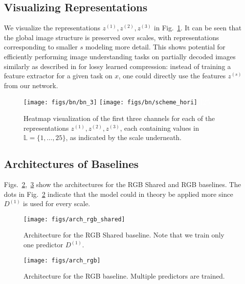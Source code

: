 \documentclass[10pt,twocolumn,letterpaper]{article}
\newcommand{\levels}{\mathbb{L}}
\begin{document}
\clearpage


\subsection{Visualizing Representations} \label{sec:visualize_repr}

We visualize the representations $z^{(1)}, z^{(2)}, z^{(3)}$ in Fig.~\ref{fig:bn}. It can be seen that the global image structure is preserved over scales, with representations corresponding to smaller $s$ modeling more detail. This shows potential for efficiently performing image understanding tasks on partially decoded images similarly as described in \cite{torfason2018towards} for lossy learned compression: instead of training a feature extractor for a given task on $x$, one could directly use the features $z^{(s)}$ from our network.

\begin{figure}[ht]
\centering
    \texttt{[image: figs/bn/bn\_3]}\vspace{-0.9ex}
    \texttt{[image: figs/bn/scheme\_hori]}\vspace{-3.1ex}
    {\tiny \textcolor{white}{1\hfill25}}
    \caption{\label{fig:bn}Heatmap visualization of the first three channels for each of the representations $z^{(1)}, z^{(2)}, z^{(3)}$, each containing values in $\levels=\{1,\dots,25\}$, as indicated by the scale underneath.}
\end{figure}


\newpage

\subsection{Architectures of Baselines}
Figs.~\ref{fig:arch_rgb_shared},~\ref{fig:arch_rgb} show the architectures for the RGB Shared and RGB baselines. The dots in Fig.~\ref{fig:arch_rgb_shared} indicate that the model could in theory be applied more since $D^{(1)}$ is used for every scale. 


\begin{figure}[ht]
\centering
\texttt{[image: figs/arch\_rgb\_shared]}
    \caption{\label{fig:arch_rgb_shared}Architecture for the RGB Shared baseline. Note that we train only one predictor $D^{(1)}$.}
\end{figure}

\begin{figure}[ht!]
\centering
\texttt{[image: figs/arch\_rgb]}
    \caption{\label{fig:arch_rgb}Architecture for the RGB baseline. Multiple predictors are trained.}
\end{figure}
\end{document}
